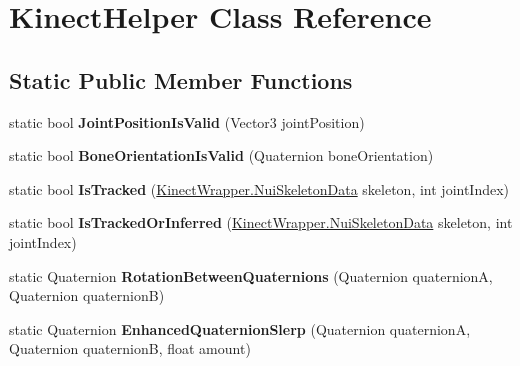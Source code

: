 \hypertarget{class_kinect_helper}{}\section{Kinect\+Helper Class Reference}
\label{class_kinect_helper}
\subsection*{Static Public Member Functions}
\begin{DoxyCompactItemize}
\item 
\mbox{\label{class_kinect_helper_a9363f32b91490038a17f0d976c179cab}} 
static bool {\bfseries Joint\+Position\+Is\+Valid} (Vector3 joint\+Position)
\item 
\mbox{\label{class_kinect_helper_ad32dda60dab4b3ca51dab2ff87c23ca4}} 
static bool {\bfseries Bone\+Orientation\+Is\+Valid} (Quaternion bone\+Orientation)
\item 
\mbox{\label{class_kinect_helper_a329affc063588a2df0f41c31f8b0435a}} 
static bool {\bfseries Is\+Tracked} (\mbox{\hyperlink{struct_kinect_wrapper_1_1_nui_skeleton_data}{Kinect\+Wrapper.\+Nui\+Skeleton\+Data}} skeleton, int joint\+Index)
\item 
\mbox{\label{class_kinect_helper_abcce6f17357f234fd21fdb167aed3f2b}} 
static bool {\bfseries Is\+Tracked\+Or\+Inferred} (\mbox{\hyperlink{struct_kinect_wrapper_1_1_nui_skeleton_data}{Kinect\+Wrapper.\+Nui\+Skeleton\+Data}} skeleton, int joint\+Index)
\item 
\mbox{\label{class_kinect_helper_a7cf4d92f0f65a88d27aa2a821b647d83}} 
static Quaternion {\bfseries Rotation\+Between\+Quaternions} (Quaternion quaternionA, Quaternion quaternionB)
\item 
\mbox{\label{class_kinect_helper_a3b96bc4fca262eff905577cee615280e}} 
static Quaternion {\bfseries Enhanced\+Quaternion\+Slerp} (Quaternion quaternionA, Quaternion quaternionB, float amount)
\item 
\mbox{\label{class_kinect_helper_a82e8bb56dfa8c75fa5d2e77fe1930fd9}} 

\end{DoxyCompactItemize}
